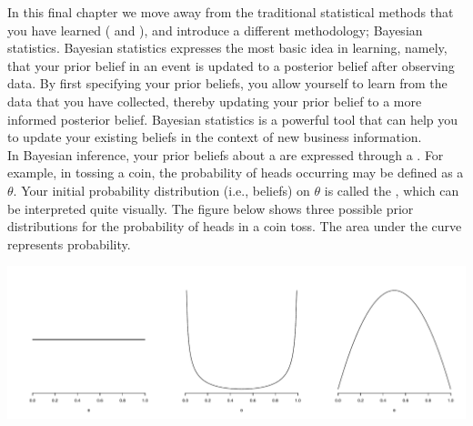\setcounter{chapter}{8}
\setcounter{section}{1}
\setcounter{question}{0}
\setcounter{hint}{0} %



In this final chapter we move away from the traditional statistical methods that you have learned ( and ), and introduce a different methodology; Bayesian statistics. Bayesian statistics expresses the most basic idea in learning, namely, that your prior belief in an event is updated to a posterior belief after observing data. By first specifying your prior beliefs, you allow yourself to learn from the data that you have collected, thereby updating your prior belief to a more informed posterior belief. Bayesian statistics is a powerful tool that can help you to update your existing beliefs in the context of new business information. \\

In Bayesian inference, your prior beliefs about a  are expressed through a . For example, in tossing a coin, the probability of heads occurring may be defined as a  $\theta$. Your initial probability distribution (i.e., beliefs) on $\theta$ is called the , which can be interpreted quite visually. The figure below shows three possible prior distributions for the probability of heads in a coin toss. The area under the curve represents probability.

\begin{center}
    \includegraphics[width=\textwidth]{Files/Images/priorDistributions.pdf}
\end{center}


